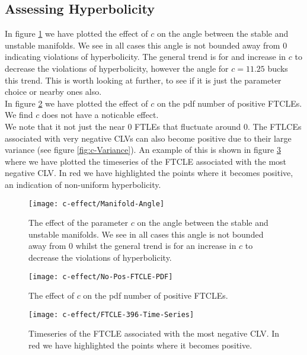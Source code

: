 \subsection{Assessing Hyperbolicity}

In figure \ref{fig:c-effect-Angle} we have plotted the effect of $c$ on the angle between the stable and unstable manifolds. We see in all cases this angle is not bounded away from $0$ indicating violations of hyperbolicity. The general trend is for and increase in $c$ to decrease the violations of hyperbolicity, however the angle for $c=11.25$ bucks this trend. This is worth looking at further, to see if it is just the parameter choice or nearby ones also.\\

In figure \ref{fig:c-effect-kd-pdf} we have plotted the effect of $c$ on the pdf number of positive FTCLEs. We find $c$ does not have a noticable effect.\\

We note that it not just the near $0$ FTLEs that fluctuate around $0$. The FTLCEs associated with very negative CLVs can also become positive due to their  large variance (see figure \ref{fig:c-Variance}). An example of this is shown in figure \ref{fig:c-effect-pos-neg-example} where we have plotted the timeseries of the FTCLE associated with the most negative CLV. In red we have highlighted the points where it becomes positive, an indication of non-uniform hyperbolicity.

\begin{figure}
\centering
\texttt{[image: c-effect/Manifold-Angle]}
\caption{The effect of the parameter $c$ on the angle between the stable and unstable manifolds. We see in all cases this angle is not bounded away from $0$ whilst the general trend is for an increase in $c$ to decrease the violations of hyperbolicity.}
\label{fig:c-effect-Angle}
\end{figure}

\begin{figure}
\centering
\texttt{[image: c-effect/No-Pos-FTCLE-PDF]}
\caption{The effect of $c$ on the pdf number of positive FTCLEs.}
\label{fig:c-effect-kd-pdf}
\end{figure}

\begin{figure}
\centering
\texttt{[image: c-effect/FTCLE-396-Time-Series]}
\caption{Timeseries of the FTCLE associated with the most negative CLV. In red we have highlighted the points where it becomes positive.}
\label{fig:c-effect-pos-neg-example}
\end{figure}
